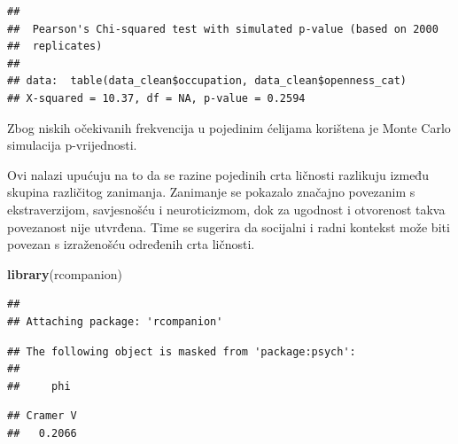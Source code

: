 \documentclass[
]{article}
\newenvironment{Shaded}{\begin{snugshade}}{\end{snugshade}}
\newcommand{\CommentTok}[1]{\textcolor[rgb]{0.56,0.35,0.01}{\textit{#1}}}
\newcommand{\DecValTok}[1]{\textcolor[rgb]{0.00,0.00,0.81}{#1}}
\newcommand{\FunctionTok}[1]{\textcolor[rgb]{0.13,0.29,0.53}{\textbf{#1}}}
\newcommand{\NormalTok}[1]{#1}
\newcommand{\OtherTok}[1]{\textcolor[rgb]{0.56,0.35,0.01}{#1}}
\newcommand{\SpecialCharTok}[1]{\textcolor[rgb]{0.81,0.36,0.00}{\textbf{#1}}}
\begin{document}
\begin{verbatim}
## 
##  Pearson's Chi-squared test with simulated p-value (based on 2000
##  replicates)
## 
## data:  table(data_clean$occupation, data_clean$openness_cat)
## X-squared = 10.37, df = NA, p-value = 0.2594
\end{verbatim}

Zbog niskih očekivanih frekvencija u pojedinim ćelijama korištena je
Monte Carlo simulacija p-vrijednosti.

Ovi nalazi upućuju na to da se razine pojedinih crta ličnosti razlikuju
između skupina različitog zanimanja. Zanimanje se pokazalo značajno
povezanim s ekstraverzijom, savjesnošću i neuroticizmom, dok za ugodnost
i otvorenost takva povezanost nije utvrđena. Time se sugerira da
socijalni i radni kontekst može biti povezan s izraženošću određenih
crta ličnosti.

\begin{Shaded}
\begin{Highlighting}[]
\FunctionTok{library}\NormalTok{(rcompanion)}
\end{Highlighting}
\end{Shaded}

\begin{verbatim}
## 
## Attaching package: 'rcompanion'
\end{verbatim}

\begin{verbatim}
## The following object is masked from 'package:psych':
## 
##     phi
\end{verbatim}

\begin{Shaded}
\end{Shaded}

\begin{verbatim}
## Cramer V 
##   0.2066
\end{verbatim}

\begin{Shaded}
\end{Shaded}
\end{document}
